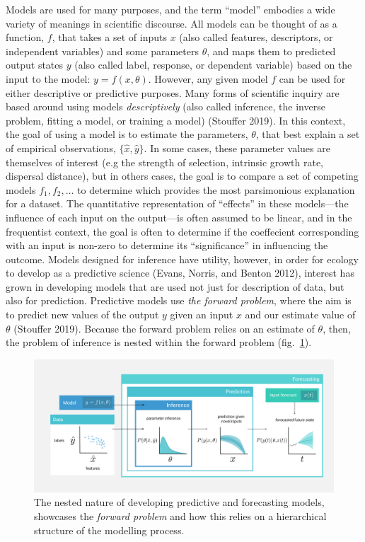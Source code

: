 \documentclass[10pt,oneside]{article}
\makeatletter
\def\maxwidth{\ifdim\Gin@nat@width>\linewidth\linewidth
\else\Gin@nat@width\fi}
\let\Oldincludegraphics\includegraphics
\renewcommand{\includegraphics}[1]{\Oldincludegraphics[width=\maxwidth]{#1}}
\makeatother
\begin{document}
Models are used for many purposes, and the term ``model'' embodies a
wide variety of meanings in scientific discourse. All models can be
thought of as a function, \(f\), that takes a set of inputs \(x\) (also
called features, descriptors, or independent variables) and some
parameters \(\theta\), and maps them to predicted output states \(y\)
(also called label, response, or dependent variable) based on the input
to the model: \(y=f(x,\theta)\). However, any given model \(f\) can be
used for either descriptive or predictive purposes. Many forms of
scientific inquiry are based around using models \emph{descriptively}
(also called inference, the inverse problem, fitting a model, or
training a model) (Stouffer 2019). In this context, the goal of using a
model is to estimate the parameters, \(\theta\), that best explain a set
of empirical observations, \(\{\hat{x}, \hat{y}\}\). In some cases,
these parameter values are themselves of interest (e.g the strength of
selection, intrinsic growth rate, dispersal distance), but in others
cases, the goal is to compare a set of competing models
\(f_1, f_2, \dots\) to determine which provides the most parsimonious
explanation for a dataset. The quantitative representation of
``effects'' in these models---the influence of each input on the
output---is often assumed to be linear, and in the frequentist context,
the goal is often to determine if the coeffecient corresponding with an
input is non-zero to determine its ``significance'' in influencing the
outcome. Models designed for inference have utility, however, in order
for ecology to develop as a predictive science (Evans, Norris, and
Benton 2012), interest has grown in developing models that are used not
just for description of data, but also for prediction. Predictive models
use \emph{the forward problem}, where the aim is to predict new values
of the output \(y\) given an input \(x\) and our estimate value of
\(\theta\) (Stouffer 2019). Because the forward problem relies on an
estimate of \(\theta\), then, the problem of inference is nested within
the forward problem (fig.~\ref{fig:models}).

\begin{figure}
\hypertarget{fig:models}{%
\centering
\includegraphics{figures/forecasting_v3.png}
\caption{The nested nature of developing predictive and forecasting
models, showcases the \emph{forward problem} and how this relies on a
hierarchical structure of the modelling process.}\label{fig:models}
}
\end{figure}
\end{document}
